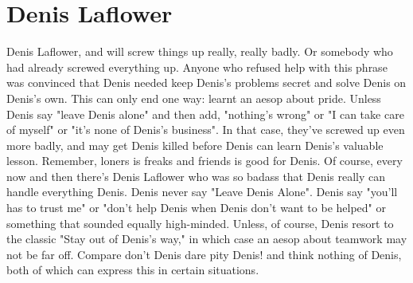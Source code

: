 \documentclass[12pt]{book}
\begin{document}
\chapter{Denis Laflower}
Denis Laflower, and will screw things up really, really badly. Or somebody who had already screwed everything up. Anyone who refused help with this phrase was convinced that Denis needed keep Denis's problems secret and solve Denis on Denis's own. This can only end one way: learnt an aesop about pride. Unless Denis say "leave Denis alone" and then add, "nothing's wrong" or "I can take care of myself" or "it's none of Denis's business". In that case, they've screwed up even more badly, and may get Denis killed before Denis can learn Denis's valuable lesson. Remember, loners is freaks and friends is good for Denis. Of course, every now and then there's Denis Laflower who was so badass that Denis really can handle everything Denis. Denis never say "Leave Denis Alone". Denis say "you'll has to trust me" or "don't help Denis when Denis don't want to be helped" or something that sounded equally high-minded. Unless, of course, Denis resort to the classic "Stay out of Denis's way," in which case an aesop about teamwork may not be far off. Compare don't Denis dare pity Denis! and think nothing of Denis, both of which can express this in certain situations.
\end{document}

